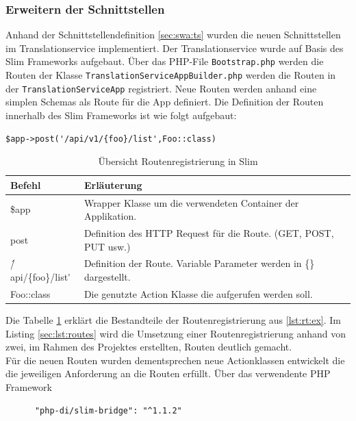 \documentclass[10pt, oneside]{article}
\begin{document}
  \subsubsection{Erweitern der Schnittstellen} \label{sec:impl:api}
    Anhand der Schnittstellendefinition \ref{sec:swa:ts} wurden die neuen Schnittstellen im Translationservice implementiert. Der Translationservice wurde auf Basis des Slim Frameworks aufgebaut.
    Über das PHP-File \lstinline{Bootstrap.php} werden die Routen der Klasse \lstinline{TranslationServiceAppBuilder.php} werden die Routen in der \lstinline{TranslationServiceApp} registriert.
    Neue Routen werden anhand eine simplen Schemas als Route für die App definiert. Die Definition der Routen innerhalb des Slim Frameworks ist wie folgt aufgebaut:
    \begin{lstlisting}[caption={Beispielroute},label=lst:rt:ex, captionpos=b]
      $app->post('/api/v1/{foo}/list',Foo::class)
    \end{lstlisting}
    \begin{table}[ht]
      \centering
      \begin{tabular}{l  l }
        \hline
        \rowcolor{carolinablue}
        Befehl & Erläuterung \\
        \hline
        \$app & Wrapper Klasse um die verwendeten Container der Applikation.\\
        \rowcolor{lightgray}
        post & Definition des HTTP Request für die Route.
                          (GET, POST, PUT usw.)\\
        \'/api/\{foo\}/list\' & Definition der Route. Variable Parameter werden in \{\} dargestellt.\\
        \rowcolor{lightgray}
        Foo::class & Die genutzte Action Klasse die aufgerufen werden soll.
      \end{tabular}
      \caption{Übersicht Routenregistrierung in Slim}
      \label{bzz}
    \end{table}
    Die Tabelle \ref{bzz} erklärt die Bestandteile der Routenregistrierung aus \ref{lst:rt:ex}.
    \newpage 
    Im Listing \ref{sec:lst:routes} wird die Umsetzung einer Routenregistrierung anhand von zwei, im Rahmen des Projektes erstellten, Routen deutlich gemacht.\\
    Für die neuen Routen wurden dementsprechen neue Actionklassen entwickelt die die jeweiligen Anforderung an die Routen erfüllt. 
    Über das verwendente PHP Framework \begin{lstlisting}
      "php-di/slim-bridge": "^1.1.2"
    \end{lstlisting}
\end{document}
